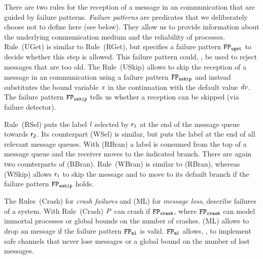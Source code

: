 There are two rules for the reception of a message in an \unrel communication that are guided by failure patterns.
\emph{Failure patterns} are predicates that we deliberately choose not to define here (see below).
They allow us to provide information about the underlying communication medium and the reliability of processes.
Rule~(\textsf{UGet}) is similar to Rule~(\textsf{RGet}), but specifies a failure pattern $ \fpUGet $ to decide whether this step is allowed.
This failure pattern could, \eg, be used to reject messages that are too old.
The Rule~(\textsf{USkip}) allows to skip the reception of a message in an \unrel communication using a failure pattern $ \fpUSkip $ and instead substitutes the bound variable $ \Args $ in the continuation with the default value $ \Args[dv] $.
The failure pattern $ \fpUSkip $ tells us whether a reception can be skipped (\eg via failure detector).

Rule~(\textsf{RSel}) puts the label $ \Label $ selected by $ \Role_1 $ at the end of the message queue towards $ \Role_2 $.
Its \weakR counterpart (\textsf{WSel}) is similar, but puts the label at the end of all relevant message queues.
%
With (\textsf{RBran}) a label is consumed from the top of a message queue and the receiver moves to the indicated branch.
There are again two \weakR counterparts of (\textsf{RBran}).
Rule~(\textsf{WBran}) is similar to (\textsf{RBran}), whereas (\textsf{WSkip}) allows $ \Role_1 $ to skip the message and to move to its default branch if the failure pattern $ \fpWSkip $ holds.

The Rules~(\textsf{Crash}) for \emph{crash failures} and (\textsf{ML}) for \emph{message loss}, describe failures of a system.
With Rule~(\textsf{Crash}) $ \PT $ can crash if $ \fpCrash $, where $ \fpCrash $ can \eg model immortal processes or global bounds on the number of crashes.
(\textsf{ML}) allows to drop an \unrel message if the failure pattern $ \fpML $ is valid.
$ \fpML $ allows, \eg, to implement safe channels that never lose messages or a global bound on the number of lost messages.

